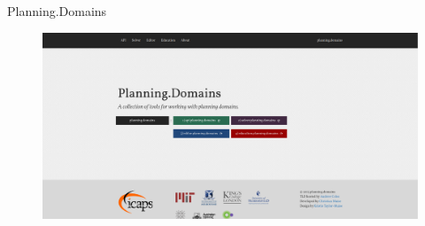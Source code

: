 \documentclass[11pt]{beamer}    %
\begin{document}
    \begin{frame}{Planning.Domains}
        \begin{figure}
            \centering
            \includegraphics[scale=0.23]{img/presentation/planning-domains}
        \end{figure}
    \end{frame}
\end{document}

